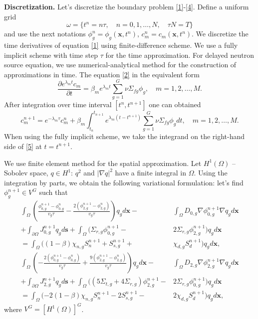 \documentclass[preprint]{elsarticle}
\begin{document}
\textbf{Discretization.}
Let's discretize the boundary problem \eqref{1}-\eqref{4}.
Define a uniform grid
\[
	\omega = \{ t^n=n \tau, \quad n = 0,1,\dots,N, \quad \tau N = T \}
\]
and use the next notations $\phi^n_g = \phi_g(\bm{x}, t^n)$, $c^n_m = c_m(\bm{x}, t^n)$. 
We discretize the time derivatives of equation \eqref{1} using finite-difference scheme. 
We use a fully implicit scheme with time step $\tau$ for the time approximation.
For delayed neutron source equation, we use numerical-analytical method for the construction of approximations in time.
The equation \eqref{2} in the equivalent form
\[
	\frac{\partial e^{\lambda_m t} c_m}{\partial t} = 
	\beta_m e^{\lambda_m t} \sum_{g=1}^{G} \nu \Sigma_{fg} \phi_g, \quad m = 1,2,\dots,M.
\]
After integration over time interval $[t^n, t^{n+1}]$ one can obtained
\begin{equation}\label{5}
	c_m^{n+1} = e^{-\lambda_m\tau} c_m^n + 
	\beta_m \int_{t_n}^{t_{n+1}} e^{\lambda_m (t - t^{n+1})} \sum_{g=1}^{G} \nu \Sigma_{fg} \phi_g d t,
	\quad m = 1,2,\dots,M.
\end{equation}
When using the fully implicit scheme, we take the integrand on the right-hand side of \eqref{5} at $t = t^{n + 1}$.

We use finite element method for the spatial approximation.
Let $H^1(\Omega)$ -- Sobolev space, $q \in H^1$: $q^2$ and $\vert\nabla q\vert^2$ have a finite integral in $\Omega$. 
Using the integration by parts, we obtain the following variational formulation: let's find $\phi^{n+1}_g \in V^G$ such that
\begin{equation}\label{6}
\begin{split}
	\int_{\Omega} 
		\left( 
			\frac{\phi^{n+1}_{0,g} - \phi^{n}_{0,g}}{v_g \tau} -
			\frac{2(\phi^{n+1}_{2,g} - \phi^{n}_{2,g})}{v_g \tau} 
		\right) q_g d\bm{x} - & %
	\int_{\Omega} D_{0,g} \nabla \phi^{n+1}_{0,g} \nabla q_g d\bm{x} \\
	+ \int_{\partial\Omega} J^{n+1}_{0,g} q_g d\bm{s} +
	\int_{\Omega}
		(
			\Sigma_{r,g} \phi^{n+1}_{0,g} - & %
			2\Sigma_{r,g} \phi^{n+1}_{2,g} 
		) q_g d\bm{x} \\
	= \int_{\Omega} 
		(
			(1 - \beta) \chi_{n,g} S^{n+1}_{n} + 
			 S^{n+1}_{s,g} + & %
			 \chi_{d,g} S^{n+1}_d 
		) q_g d\bm{x}, \\
	\int_{\Omega} 
		\left( 
			- \frac{2(\phi^{n+1}_{0,g} - \phi^{n}_{0,g})}{v_g \tau} + 
			\frac{9(\phi^{n+1}_{2,g} - \phi^{n}_{2,g})}{v_g \tau} 
		\right) q_g d\bm{x} - & %
	\int_{\Omega} D_{2,g} \nabla \phi^{n+1}_{2,g} \nabla  q_g d\bm{x} \\
	+ \int_{\partial\Omega} J^{n+1}_{2,g} q_g d\bm{s} + 
	\int_{\Omega} 
		( 
			(5 \Sigma_{t,g} + 
			4 \Sigma_{r,g}) \phi^{n+1}_{2,g} - & %
			2\Sigma_{r,g} \phi^{n+1}_{0,g} 
		) q_g d\bm{x} \\
	= \int_{\Omega}
		( 
			- 2(1 - \beta) \chi_{n,g} S^{n+1}_{n} - 
			2S^{n+1}_{s,g} - & %
			2\chi_{d,g} S^{n+1}_d 
		) q_g d\bm{x},
\end{split}
\end{equation}
where $V^G=[H^1(\Omega)]^G$.
\end{document}
